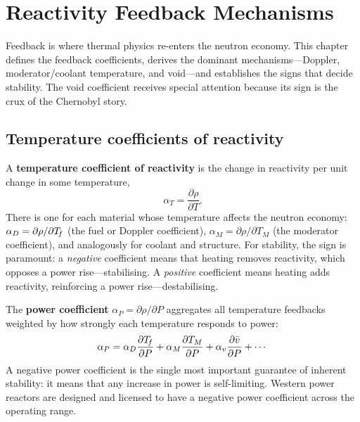 \chapter{Reactivity Feedback Mechanisms}
\label{ch:feedback}

Feedback is where thermal physics re-enters the neutron economy. This chapter
defines the feedback coefficients, derives the dominant mechanisms---Doppler,
moderator/coolant temperature, and void---and establishes the signs that decide
stability. The void coefficient receives special attention because its sign is
the crux of the Chernobyl story.

\section{Temperature coefficients of reactivity}

A \textbf{temperature coefficient of reactivity} is the change in reactivity per
unit change in some temperature,
\begin{equation}
\alpha_T = \frac{\partial \rho}{\partial T}.
\end{equation}
There is one for each material whose temperature affects the neutron economy:
$\alpha_D=\partial\rho/\partial T_{\!f}$ (the fuel or Doppler coefficient),
$\alpha_M=\partial\rho/\partial T_M$ (the moderator coefficient), and analogously
for coolant and structure. For stability, the sign is paramount: a
\emph{negative} coefficient means that heating removes reactivity, which opposes a
power rise---stabilising. A \emph{positive} coefficient means heating adds
reactivity, reinforcing a power rise---destabilising.

\begin{definition}
The \textbf{power coefficient} $\alpha_P=\partial\rho/\partial P$ aggregates all
temperature feedbacks weighted by how strongly each temperature responds to
power:
\begin{equation}
\alpha_P = \alpha_D\frac{\partial T_{\!f}}{\partial P}
         + \alpha_M\frac{\partial T_M}{\partial P}
         + \alpha_v\frac{\partial \bar v}{\partial P} + \cdots
\end{equation}
A negative power coefficient is the single most important guarantee of inherent
stability: it means that any increase in power is self-limiting. Western power
reactors are designed and licensed to have a negative power coefficient across
the operating range.
\end{definition}


